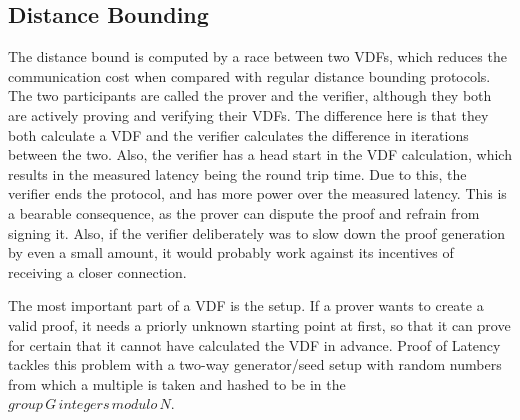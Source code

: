 \subsection{Distance Bounding}
The distance bound is computed by a race between two VDFs, which reduces the communication cost when compared with regular distance bounding protocols. The two participants are called the prover and the verifier, although they both are actively proving and verifying their VDFs. The difference here is that they both calculate a VDF and the verifier calculates the difference in iterations between the two. Also, the verifier has a head start in the VDF calculation, which results in the measured latency being the round trip time. Due to this, the verifier ends the protocol, and has more power over the measured latency. This is a bearable consequence, as the prover can dispute the proof and refrain from signing it. Also, if the verifier deliberately was to slow down the proof generation by even a small amount, it would probably work against its incentives of receiving a closer connection.

The most important part of a VDF is the setup. If a prover wants to create a valid proof, it needs a priorly unknown starting point at first, so that it can prove for certain that it cannot have calculated the VDF in advance. Proof of Latency tackles this problem with a two-way generator/seed setup with random numbers from which a multiple is taken and hashed to be in the \(group\, G\, integers\, modulo\, N\).

